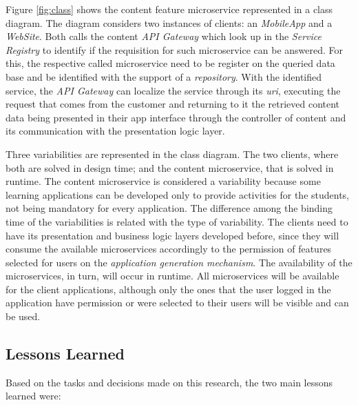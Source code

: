 Figure \ref{fig:class} shows the content feature microservice represented in a class diagram. The diagram considers two instances of clients: an \textit{MobileApp} and a \textit{WebSite}. Both calls the content \textit{API Gateway} which look up in the \textit{Service Registry} to identify if the requisition for such microservice can be answered. For this, the respective called microservice need to be register on the queried data base and be identified with the support of a \textit{repository}. With the identified service, the \textit{API Gateway} can localize the service through its \textit{uri}, executing the request that comes from the customer and returning to it the retrieved content data being presented in their app interface through the controller of content and its communication with the presentation logic layer.

Three variabilities are represented in the class diagram. The two clients, where both are solved in design time; and the content microservice, that is solved in runtime. The content microservice is considered a variability because some learning applications can be developed only to provide activities for the students, not being mandatory for every application. The difference among the binding time of the variabilities is related with the type of variability. The clients need to have its presentation and business logic layers developed before, since they will consume the available microservices accordingly to the permission of features selected for users on the \textit{application generation mechanism}. The availability of the microservices, in turn, will occur in runtime. All microservices will be available for the client applications, although only the ones that the user logged in the application have permission or were selected to their users will be visible and can be used.




\subsection{Lessons Learned}

Based on the tasks and decisions made on this research, the two main lessons learned were:


